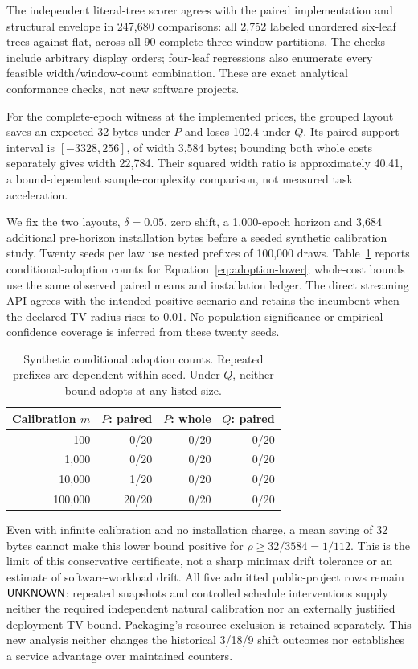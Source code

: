 \documentclass[10pt,journal,compsoc]{IEEEtran}
\theoremstyle{definition}\newtheorem{definition}[theorem]{Definition}
\begin{document}
The independent literal-tree scorer agrees with the paired implementation
and structural envelope in 247,680 comparisons: all 2,752 labeled unordered
six-leaf trees against flat, across all 90 complete three-window partitions.
The checks include arbitrary display orders; four-leaf regressions also
enumerate every feasible width/window-count combination. These are exact
analytical conformance checks, not new software projects.

For the complete-epoch witness at the implemented prices, the grouped
layout saves an expected 32 bytes under $P$ and loses 102.4 under $Q$.
Its paired support interval is $[-3328,256]$, of width 3,584 bytes;
bounding both whole costs separately gives width 22,784. Their squared
width ratio is approximately 40.41, a bound-dependent sample-complexity
comparison, not measured task acceleration.

We fix the two layouts, $\delta=0.05$, zero shift, a 1,000-epoch horizon
and 3,684 additional pre-horizon installation bytes before a seeded
synthetic calibration study. Twenty seeds per law use nested prefixes of
100,000 draws. Table~\ref{tab:v13-adoption} reports conditional-adoption
counts for Equation~\eqref{eq:adoption-lower}; whole-cost bounds use the
same observed paired means and installation ledger. The direct streaming
API agrees with the intended positive scenario and retains the incumbent
when the declared TV radius rises to 0.01. No population significance or
empirical confidence coverage is inferred from these twenty seeds.

\begin{table}[t]\centering\small
\caption{Synthetic conditional adoption counts. Repeated prefixes are
dependent within seed. Under $Q$, neither bound adopts at any listed size.}
\label{tab:v13-adoption}
\begin{tabular}{@{}rrrr@{}}\toprule
Calibration $m$ & $P$: paired & $P$: whole & $Q$: paired\\\midrule
100 & 0/20 & 0/20 & 0/20\\
1,000 & 0/20 & 0/20 & 0/20\\
10,000 & 1/20 & 0/20 & 0/20\\
100,000 & 20/20 & 0/20 & 0/20\\
\bottomrule\end{tabular}
\end{table}

Even with infinite calibration and no installation charge, a mean saving
of 32 bytes cannot make this lower bound positive for
$\rho\ge32/3584=1/112$. This is the limit of this conservative certificate,
not a sharp minimax drift tolerance or an estimate of software-workload drift.
All five admitted public-project rows remain $\mathsf{UNKNOWN}$: repeated
snapshots and controlled schedule interventions supply neither the required
independent natural calibration nor an externally justified deployment TV
bound. Packaging's resource exclusion is retained separately. This new
analysis neither changes the historical 3/18/9 shift outcomes nor establishes
a service advantage over maintained counters.
\end{document}
